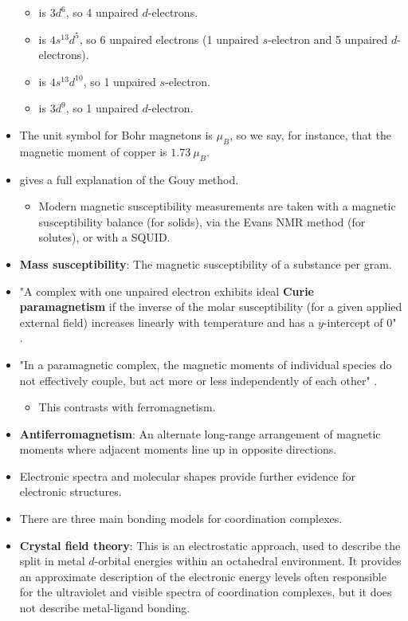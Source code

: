 \documentclass[../notes.tex]{subfiles}
\begin{document}
\begin{itemize}
\begin{itemize}
        \item {} is $3d^6$, so 4 unpaired $d$-electrons.
        \item {} is $4s^13d^5$, so 6 unpaired electrons (1 unpaired $s$-electron and 5 unpaired $d$-electrons).
        \item {} is $4s^13d^{10}$, so 1 unpaired $s$-electron.
        \item {} is $3d^9$, so 1 unpaired $d$-electron.
    \end{itemize}
    \item The unit symbol for Bohr magnetons is $\mu_B$, so we say, for instance, that the magnetic moment of copper is $\SI{1.73}{\mu_B}$.
    \item \textcite{bib:MiesslerFischerTarr} gives a full explanation of the Gouy method.
    \begin{itemize}
        \item Modern magnetic susceptibility measurements are taken with a magnetic susceptibility balance (for solids), via the Evans NMR method (for solutes), or with a SQUID.
    \end{itemize}
    \item \textbf{Mass susceptibility}: The magnetic susceptibility of a substance per gram.
    \item "A complex with one unpaired electron exhibits ideal \textbf{Curie paramagnetism} if the inverse of the molar susceptibility (for a given applied external field) increases linearly with temperature and has a $y$-intercept of 0" \parencite[362]{bib:MiesslerFischerTarr}.
    \item "In a paramagnetic complex, the magnetic moments of individual species do not effectively couple, but act more or less independently of each other" \parencite[362]{bib:MiesslerFischerTarr}.
    \begin{itemize}
        \item This contrasts with ferromagnetism.
    \end{itemize}
    \item \textbf{Antiferromagnetism}: An alternate long-range arrangement of magnetic moments where adjacent moments line up in opposite directions.
    \item Electronic spectra and molecular shapes provide further evidence for electronic structures.
    \item There are three main bonding models for coordination complexes.
    \item \textbf{Crystal field theory}: This is an electrostatic approach, used to describe the split in metal $d$-orbital energies within an octahedral environment. It provides an approximate description of the electronic energy levels often responsible for the ultraviolet and visible spectra of coordination complexes, but it does not describe metal-ligand bonding.

\end{itemize}
\end{document}
